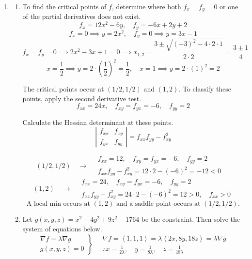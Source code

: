 \documentclass[a4paper, 12pt]{article}
\begin{document}
\begin{enumerate}[leftmargin=*,label=\textbf{\arabic*.}]
\item \begin{enumerate}[leftmargin=*,label=\textbf{\alph*.}]
\item To find the critical points of $f$, determine where both $f_x=f_y=0$ or one of the partial derivatives does not exist.
\[f_x=12x^2-6y,\quad f_y=-6x+2y+2\]
\[f_x=0\implies y=2x^2,\quad f_y=0\implies y=3x-1\]
\[f_x=f_y=0\implies 2x^2-3x+1=0\implies x_{1,2}=\frac{3\pm\sqrt{(-3)^2-4\cdot2\cdot 1}}{2\cdot2}=\frac{3\pm1}{4}\]
\[x=\frac12\implies y=2\cdot\left(\frac12\right)^2=\frac12,\quad x=1\implies y=2\cdot(1)^2=2\]

The critical points occur at $\left(1/2,1/2\right)$ and $(1,2)$. To classify these points, apply the second derivative test.
\[f_{xx}=24x,\quad f_{xy}=f_{yx}=-6,\quad f_{yy}=2\]

Calculate the Hessian determinant at these points.
\[\left|\begin{array}{cc}
f_{xx}&f_{xy}\\
f_{yx}&f_{yy}
\end{array}\right|=f_{xx}f_{yy}-f_{xy}^2\]

\[(1/2,1/2)\quad\rightarrow\quad\begin{array}{l}f_{xx}=12,\quad f_{xy}=f_{yx}=-6,\quad f_{yy}=2\\[1em]
f_{xx}f_{yy}-f_{xy}^2=12\cdot2-(-6)^2=-12<0\quad\end{array}\]
\[(1,2)\quad\rightarrow\quad\begin{array}{l}f_{xx}=24,\quad f_{xy}=f_{yx}=-6,\quad f_{yy}=2\\[1em]f_{xx}f_{yy}-f_{xy}^2=24\cdot2-(-6)^2=12>0,\quad f_{xx}>0\end{array}\]
\[\boxed{\text{A local min occurs at } (1,2) \text{ and a saddle point occurs at } (1/2,1/2).}\]

\item Let $g(x,y,z)=x^2+4y^2+9z^2-1764$ be the constraint. Then solve the system of equations below.
\[
\left.
\begin{array}{ll}
\displaystyle\nabla f=\lambda\nabla g\\
\displaystyle g(x,y,z)=0
\end{array}
\right\}\quad
\begin{array}{ll}
\nabla f=\left\langle1,1,1\right\rangle=\lambda\left\langle2x,8y,18z\right\rangle=\lambda\nabla g\\[1em]\displaystyle\therefore x=\frac1{2\lambda},\quad y=\frac1{8\lambda},\quad z=\frac1{18\lambda}
\end{array}
\]


\end{enumerate}
\end{enumerate}
\end{document}
